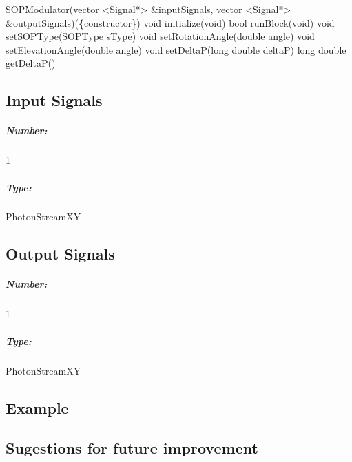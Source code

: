 \begin{refsection}
SOPModulator(vector <Signal*> \&inputSignals, vector <Signal*> \&outputSignals)(\textbf\{constructor\})
\bigbreak
void initialize(void)
\bigbreak
bool runBlock(void)
\bigbreak
void setSOPType(SOPType sType)
\bigbreak
void setRotationAngle(double angle)
\bigbreak
void setElevationAngle(double angle)
\bigbreak
void setDeltaP(long double deltaP)
\bigbreak
long double getDeltaP()


\pagebreak

\subsection*{Input Signals}

\subparagraph*{Number:} 1

\subparagraph*{Type:} PhotonStreamXY

\subsection*{Output Signals}

\subparagraph*{Number:} 1

\subparagraph*{Type:} PhotonStreamXY

\subsection*{Example}

\subsection*{Sugestions for future improvement}

\clearpage
\printbibliography[heading=subbibliography]
\end{refsection}
\cleardoublepage
